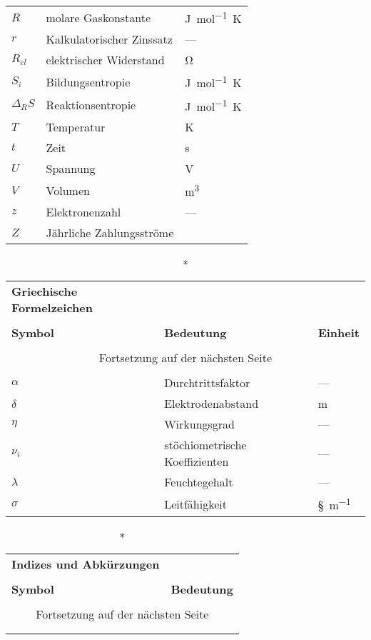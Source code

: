 \begin{onehalfspacing}
\begin{longtable}[h]{p{} p{} p{}}
		$R$ 		& molare Gaskonstante 										& \si{\joule\per\mol\kelvin}\\
		$r$			& Kalkulatorischer Zinssatz									& ---\\
		$R_{el}$ 	& elektrischer Widerstand									& \si{\ohm}\\
		$S_i$		& Bildungsentropie											& \si{\joule\per\mol\kelvin}\\
		$\Delta_R S$	& Reaktionsentropie 									& \si{\joule\per\mol\kelvin}\\
		$T$ 		& Temperatur 												& \si{\kelvin}\\
		$t$ 		& Zeit 														& \si{\second}\\
		$U$ 		& Spannung 													& \si{\V}\\
		$V$ 		& Volumen 													& \si{\meter^{3}}\\
		$z$ 		& Elektronenzahl		 									& --- \\
		$Z$			& Jährliche Zahlungsströme									& \si{\sieuro}\\
		
\end{longtable}

\begin{longtable}[h]{p{} p{} p{}}
		\caption*{\textbf{Griechische Formelzeichen}} \\
		\\
		\textbf{Symbol} & \textbf{Bedeutung} & \textbf{Einheit} \\ %
		\endhead
		\\
		\multicolumn{3}{c}{Fortsetzung auf der nächsten Seite} \\
		\endfoot
		\multicolumn{3}{c}{ } \\
		\endlastfoot
		
		$\alpha$	& Durchtrittsfaktor											& ---\\		
		$\delta$	& Elektrodenabstand											& \si{\m}\\
		$\eta$		& Wirkungsgrad												& ---\\
		$\nu_i$ 	& stöchiometrische Koeffizienten							& ---\\
		$\lambda$	& Feuchtegehalt												& ---\\
		$\sigma$	& Leitfähigkeit												& \si{\S\per\m}\\


\end{longtable}

\begin{longtable}[h]{p{} p{}}
		\caption*{\textbf{Indizes und Abkürzungen}} \\
		\\
		\textbf{Symbol} & \textbf{Bedeutung} \\ %
		\endhead
		\\
		\multicolumn{2}{c}{Fortsetzung auf der nächsten Seite} \\
		\endfoot
		\multicolumn{2}{c}{ } \\
		\endlastfoot
		

\end{longtable}
\end{onehalfspacing}
